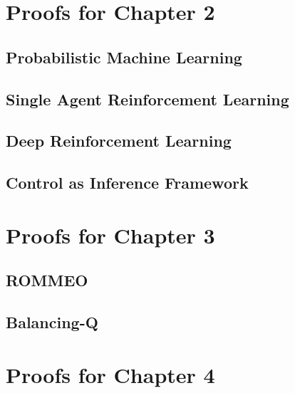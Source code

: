 \documentclass{report}
\begin{document}
% 



\chapter{Proofs for Chapter 2}

\section {Probabilistic Machine Learning}


\section {Single Agent Reinforcement Learning}


\section {Deep Reinforcement Learning}


\section {Control as Inference Framework}


\chapter{Proofs for Chapter 3}

\section {ROMMEO}


\section {Balancing-Q}


\chapter{Proofs for Chapter 4}




% 
\end{document}
